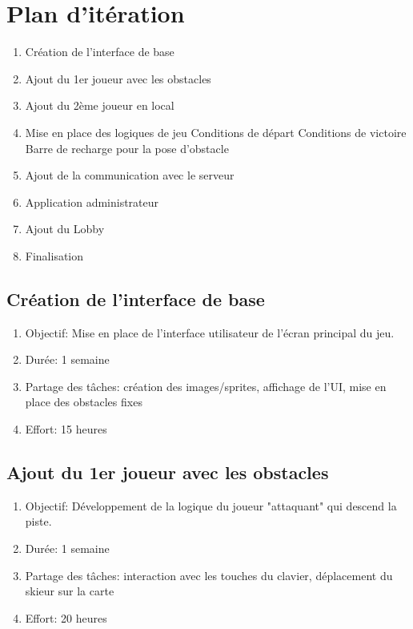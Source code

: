 \documentclass[a4paper,11pt]{article}
\begin{document}
	\newpage
	\section{Plan d'itération}
		\begin{enumerate}
			\item Création de l'interface de base
			\item Ajout du 1er joueur avec les obstacles
			\item Ajout du 2ème joueur en local
			\item Mise en place des logiques de jeu
				\subitem Conditions de départ
				\subitem Conditions de victoire
				\subitem Barre de recharge pour la pose d'obstacle
			\item Ajout de la communication avec le serveur
			\item Application administrateur
			\item Ajout du Lobby
			\item Finalisation
		\end{enumerate}
	
		\subsection{Création de l'interface de base}
			\begin{enumerate}
				\item[] Objectif: Mise en place de l'interface utilisateur de l'écran principal du jeu.
				\item[] Durée: 1 semaine
				\item[] Partage des tâches: création des images/sprites, affichage de l'UI, mise en place des obstacles fixes
				\item[] Effort: 15 heures
			\end{enumerate}
		\subsection{Ajout du 1er joueur avec les obstacles}
		\begin{enumerate}
			\item[] Objectif: Développement de la logique du joueur "attaquant" qui descend la piste.
			\item[] Durée: 1 semaine
			\item[] Partage des tâches: interaction avec les touches du clavier, déplacement du skieur sur la carte
			\item[] Effort: 20 heures
		\end{enumerate}
\end{document}

